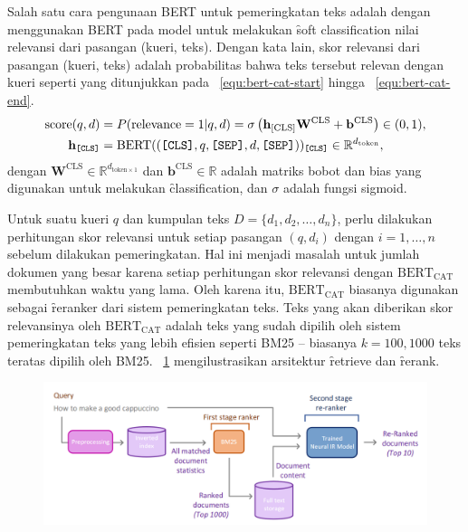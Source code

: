 		Salah satu cara pengunaan BERT untuk pemeringkatan teks adalah dengan menggunakan BERT pada
		model untuk melakukan \f{soft classification} nilai relevansi dari pasangan (kueri, teks). Dengan kata lain, skor relevansi dari pasangan (kueri, teks) adalah probabilitas bahwa teks tersebut relevan dengan kueri seperti yang ditunjukkan pada \equ~\ref{equ:bert-cat-start} hingga \equ~\ref{equ:bert-cat-end}.
		\begin{align}
			\label{equ:bert-cat-start}
			\text{score}(q,d) &= P(\text{relevance} = 1 | q, d) = \sigma\left(  \mathbf{h}_{\text{[CLS]}} \mathbf{W}^{\text{CLS}}+\mathbf{b}^{\text{CLS}} \right) \in (0,1), \\
			\label{equ:bert-cat-end}
			\mathbf{h}_{\text{\texttt{[CLS]}}} &= \text{BERT}((\text{\texttt{[CLS]}}, q, \text{\texttt{[SEP]}}, d, \text{\texttt{[SEP]}}))_{\text{\texttt{[CLS]}}} \in \mathbb{R}^{d_{\text{token}}},
		\end{align}
		dengan $\mathbf{W}^{\text{CLS}} \in \mathbb{R}^{d_{\text{token} \times 1}}$ dan $\mathbf{b}^{\text{CLS}} \in \mathbb{R}$ adalah matriks bobot dan bias yang digunakan untuk melakukan \f{classification}, dan $\sigma$ adalah fungsi sigmoid.

		Untuk suatu kueri $q$ dan kumpulan teks $D = \{d_1, d_2, \dots, d_n\}$, perlu dilakukan perhitungan skor relevansi untuk setiap pasangan $(q, d_i)$ dengan $i=1,\dots,n$ sebelum dilakukan pemeringkatan. Hal ini menjadi masalah untuk jumlah dokumen yang besar karena setiap perhitungan skor relevansi dengan $\text{BERT}_{\text{CAT}}$ membutuhkan waktu yang lama. Oleh karena itu, $\text{BERT}_{\text{CAT}}$ biasanya digunakan sebagai \f{reranker} dari sistem pemeringkatan teks. Teks yang akan diberikan skor relevansinya oleh $\text{BERT}_{\text{CAT}}$ adalah teks yang sudah dipilih oleh sistem pemeringkatan teks yang lebih efisien seperti {BM25} -- biasanya $k = 100, 1000$ teks teratas dipilih oleh {BM25}. \pic~\ref{fig:bert-cat-withbm25} mengilustrasikan arsitektur \f{retrieve} dan \f{rerank}.

		\begin{figure}[!ht]
			\centering
			\includegraphics[width=1\textwidth]{assets/pics/neural-ir.png}
			\label{fig:bert-cat-withbm25}
		\end{figure}

